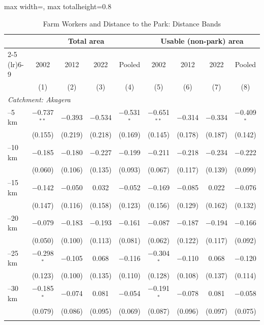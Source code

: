 \documentclass[11pt]{article}
\begin{document}
\begin{table}[H]
\centering\footnotesize\setlength{\tabcolsep}{4pt}
\caption{Farm Workers and Distance to the Park: Distance Bands}
\label{tab:dist_bands_farm}
\begin{adjustbox}{max width=\textwidth, max totalheight=0.8\textheight}
\begin{tabular}{lcccccccc}
\toprule
 & \multicolumn{4}{c}{Total area} & \multicolumn{4}{c}{Usable (non-park) area} \\
\cmidrule(lr){2-5} \cmidrule(lr){6-9}
 & 2002 & 2012 & 2022 & Pooled & 2002 & 2012 & 2022 & Pooled \\
 & (1) & (2) & (3) & (4) & (5) & (6) & (7) & (8) \\
\midrule
\multicolumn{9}{l}{\textit{Catchment: Akagera}} \\
\quad 0--5 km & $-$0.737$^{**}$ & $-$0.393 & $-$0.534 & $-$0.531$^{*}$ & $-$0.651$^{**}$ & $-$0.314 & $-$0.334 & $-$0.409$^{*}$ \\
 & (0.155) & (0.219) & (0.218) & (0.169) & (0.145) & (0.178) & (0.187) & (0.142) \\
\quad 5--10 km & $-$0.185 & $-$0.180 & $-$0.227 & $-$0.199 & $-$0.211 & $-$0.218 & $-$0.234 & $-$0.222 \\
 & (0.060) & (0.106) & (0.135) & (0.093) & (0.067) & (0.117) & (0.139) & (0.099) \\
\quad 10--15 km & $-$0.142 & $-$0.050 & 0.032 & $-$0.052 & $-$0.169 & $-$0.085 & 0.022 & $-$0.076 \\
 & (0.147) & (0.116) & (0.158) & (0.123) & (0.156) & (0.129) & (0.162) & (0.132) \\
\quad 15--20 km & $-$0.079 & $-$0.183 & $-$0.193 & $-$0.161 & $-$0.087 & $-$0.187 & $-$0.194 & $-$0.166 \\
 & (0.050) & (0.100) & (0.113) & (0.081) & (0.062) & (0.122) & (0.117) & (0.092) \\
\quad 20--25 km & $-$0.298$^{*}$ & $-$0.105 & 0.068 & $-$0.116 & $-$0.304$^{*}$ & $-$0.110 & 0.068 & $-$0.120 \\
 & (0.123) & (0.100) & (0.135) & (0.110) & (0.128) & (0.108) & (0.137) & (0.114) \\
\quad 25--30 km & $-$0.185$^{*}$ & $-$0.074 & 0.081 & $-$0.054 & $-$0.191$^{*}$ & $-$0.078 & 0.081 & $-$0.058 \\
 & (0.079) & (0.086) & (0.095) & (0.069) & (0.087) & (0.096) & (0.097) & (0.075) \\
\addlinespace
\multicolumn{9}{l}{\textit{Catchment: Gishwati--Mukura}} \\

\end{tabular}
\end{adjustbox}
\end{table}
\end{document}
